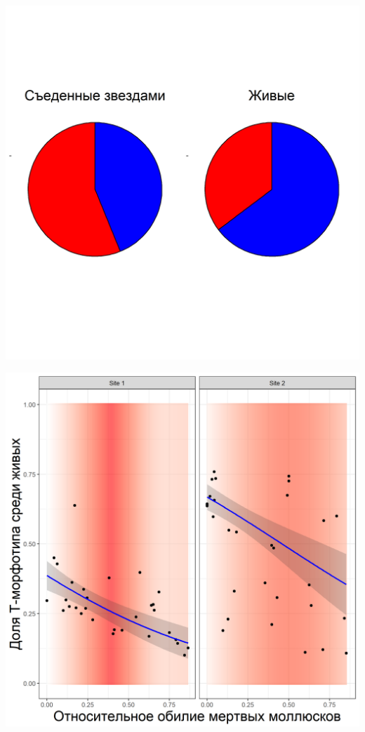 \documentclass[20pt,a0,portrait]{a0poster}
\begin{document}
\begin{minipage}[t]{0.5\linewidth}
%
\begin{minipage}[t]{0.46\linewidth}		
	\begin{center}\vspace{0.1cm}
			\includegraphics[width=0.9\linewidth]{Pay_charts_aster.png}
			\label{Fig_pay_chart_aster}
		\end{center}
\end{minipage}\hspace{1cm}
%
\begin{minipage}[t]{0.46\linewidth}		
	\begin{center}\vspace{0.1cm}
			\includegraphics[width=0.9\linewidth]{Prop_dead_Prop_T.png}

\end{center}
\end{minipage}
\end{minipage}
\end{document}
